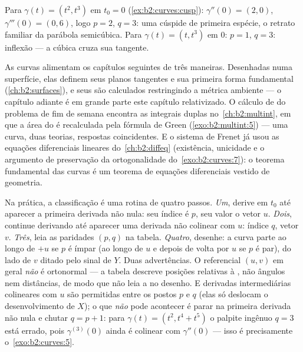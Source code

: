 \begin{example}
Para $\gamma(t) = (t^2, t^3)$ em $t_0 = 0$
(\cref{ex:b2:curves:cusp}): $\gamma'' (0)= (2, 0)$, $\gamma'''(0) =
(0, 6)$, logo $p = 2$, $q = 3$: uma cúspide de primeira espécie, o
retrato familiar da parábola semicúbica. Para $\gamma(t) = (t,
t^3)$ em $0$: $p = 1$, $q = 3$: inflexão --- a cúbica cruza
sua tangente.
\end{example}

\begin{remark}
As curvas alimentam os capítulos seguintes de três maneiras. Desenhadas numa
superfície, elas definem seus planos tangentes e sua primeira
forma fundamental (\cref{ch:b2:surfaces}), e seus 
são calculados restringindo a métrica ambiente --- o
capítulo adiante é em grande parte este capítulo relativizado. O
cálculo de  do problema de fim de semana encontra as integrais
duplas no~\cref{ch:b2:multint}, em que a área do 
é recalculada pela fórmula de Green
(\cref{exo:b2:multint:5}) --- uma curva, duas teorias,
respostas coincidentes. E o sistema de Frenet já usou as
equações diferenciais lineares do~\cref{ch:b2:diffeq}
(existência, unicidade e o argumento de preservação da
ortogonalidade do~\cref{exo:b2:curves:7}): o teorema fundamental
das curvas é um teorema de equações diferenciais vestido de
geometria.
\end{remark}

\begin{remark}
Na prática, a classificação é uma rotina de quatro passos.
\emph{Um}, derive em $t_0$ até aparecer a primeira derivada
não nula: seu índice é $p$, seu valor o vetor
$u$. \emph{Dois}, continue derivando até aparecer uma derivada
não colinear com $u$: índice $q$, vetor $v$.
\emph{Três}, leia as paridades $(p, q)$ na tabela.
\emph{Quatro}, desenhe: a curva parte ao longo de $+u$ se $p$ é ímpar
(ao longo de $u$ e depois de volta por $u$ se $p$ é par), do lado
de $v$ ditado pelo sinal de $Y$. Duas advertências. O referencial
$(u, v)$ em geral \emph{não} é ortonormal --- a tabela
descreve posições relativas à , não ângulos
nem distâncias, de modo que não leia a  no desenho.
E derivadas intermediárias colineares com $u$ são permitidas
entre os postos $p$ e $q$ (elas só deslocam o desenvolvimento de
$X$); o que \emph{não} pode acontecer é parar na primeira
derivada não nula e chutar $q = p + 1$: para $\gamma(t)
= (t^2, t^4 + t^5)$ o palpite ingênuo $q = 3$ está errado, pois
$\gamma^{(3)}(0)$ ainda é colinear com $\gamma''(0)$ ---
isso é precisamente o~\cref{exo:b2:curves:5}.
\end{remark}

